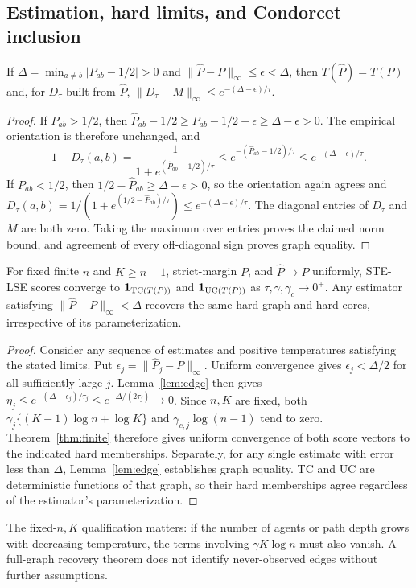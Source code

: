 \subsection{Estimation, hard limits, and Condorcet inclusion}
\begin{lemma}\label{lem:edge}
If $\Delta=\min_{a\ne b}|P_{ab}-1/2|>0$ and $\|\widehat P-P\|_\infty\le\epsilon<\Delta$, then $T(\widehat P)=T(P)$ and, for $D_\tau$ built from $\widehat P$,
$\|D_\tau-M\|_\infty\le e^{-(\Delta-\epsilon)/\tau}$.
\end{lemma}
\begin{proof}
If $P_{ab}>1/2$, then $\widehat P_{ab}-1/2\ge P_{ab}-1/2-\epsilon\ge\Delta-\epsilon>0$. The empirical orientation is therefore unchanged, and
\[
1-D_\tau(a,b)=\frac1{1+e^{(\widehat P_{ab}-1/2)/\tau}}
\le e^{-(\widehat P_{ab}-1/2)/\tau}\le e^{-(\Delta-\epsilon)/\tau}.
\]
If $P_{ab}<1/2$, then $1/2-\widehat P_{ab}\ge\Delta-\epsilon>0$, so the orientation again agrees and
$D_\tau(a,b)=1/(1+e^{(1/2-\widehat P_{ab})/\tau})\le e^{-(\Delta-\epsilon)/\tau}$.
The diagonal entries of $D_\tau$ and $M$ are both zero. Taking the maximum over entries proves the claimed norm bound, and agreement of every off-diagonal sign proves graph equality.
\end{proof}

\begin{corollary}\label{cor:limit}
For fixed finite $n$ and $K\ge n-1$, strict-margin $P$, and $\widehat P\to P$ uniformly, STE-LSE scores converge to $\mathbf1_{\mathrm{TC}(T(P))}$ and $\mathbf1_{\mathrm{UC}(T(P))}$ as $\tau,\gamma,\gamma_c\to0^+$. Any estimator satisfying $\|\widehat P-P\|_\infty<\Delta$ recovers the same hard graph and hard cores, irrespective of its parameterization.
\end{corollary}
\begin{proof}
Consider any sequence of estimates and positive temperatures satisfying the stated limits. Put $\epsilon_j=\|\widehat P_j-P\|_\infty$. Uniform convergence gives $\epsilon_j<\Delta/2$ for all sufficiently large $j$. Lemma~\ref{lem:edge} then gives
$\eta_j\le e^{-(\Delta-\epsilon_j)/\tau_j}\le e^{-\Delta/(2\tau_j)}\to0$.
Since $n,K$ are fixed, both $\gamma_j\{(K-1)\log n+\log K\}$ and $\gamma_{c,j}\log(n-1)$ tend to zero. Theorem~\ref{thm:finite} therefore gives uniform convergence of both score vectors to the indicated hard memberships. Separately, for any single estimate with error less than $\Delta$, Lemma~\ref{lem:edge} establishes graph equality. TC and UC are deterministic functions of that graph, so their hard memberships agree regardless of the estimator's parameterization.
\end{proof}
The fixed-$n,K$ qualification matters: if the number of agents or path depth grows with decreasing temperature, the terms involving $\gamma K\log n$ must also vanish. A full-graph recovery theorem does not identify never-observed edges without further assumptions.

